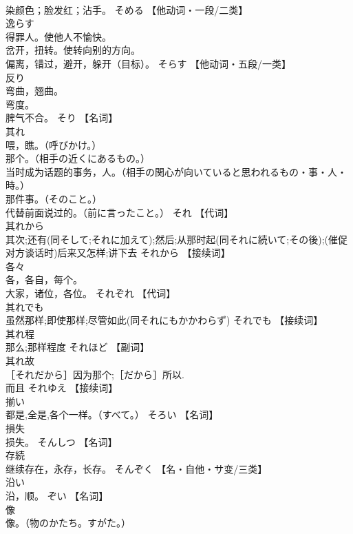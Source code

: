 \documentclass[8pt]{extreport}
\begin{document}
\begin{CJK}{UTF8}{min}
\\	染颜色；脸发红；沾手。	そめる		【他动词・一段/二类】
\\	逸らす	
\\	得罪人。使他人不愉快。 
\\	岔开，扭转。使转向别的方向。 
\\	偏离，错过，避开，躲开（目标）。	そらす		【他动词・五段/一类】
\\	反り	
\\	弯曲，翘曲。 
\\	弯度。 
\\	脾气不合。	そり		【名词】
\\	其れ	
\\	喂，瞧。（呼びかけ。） 
\\	那个。（相手の近くにあるもの。） 
\\	当时成为话题的事务，人。（相手の関心が向いていると思われるもの・事・人・時。） 
\\	那件事。（そのこと。） 
\\	代替前面说过的。（前に言ったこと。）	それ		【代词】
\\	其れから	
\\	其次;还有(同そして;それに加えて);然后;从那时起(同それに続いて;その後);(催促对方谈话时)后来又怎样;讲下去	それから		【接续词】
\\	各々	
\\	各，各自，每个。 
\\	大家，诸位，各位。	それぞれ		【代词】
\\	其れでも	
\\	虽然那样;即使那样;尽管如此(同それにもかかわらず)	それでも		【接续词】
\\	其れ程	
\\	那么;那样程度	それほど		【副词】
\\	其れ故	
\\	［それだから］因为那个;［だから］所以. 
\\	而且	それゆえ		【接续词】
\\	揃い	
\\	都是,全是,各个一样。（すべて。）	そろい		【名词】
\\	損失	
\\	损失。	そんしつ		【名词】
\\	存続	
\\	继续存在，永存，长存。	そんぞく		【名・自他・サ变/三类】
\\	沿い	
\\	沿，顺。	ぞい		【名词】
\\	像	
\\	像。（物のかたち。すがた。） 

\end{CJK}
\end{document}
